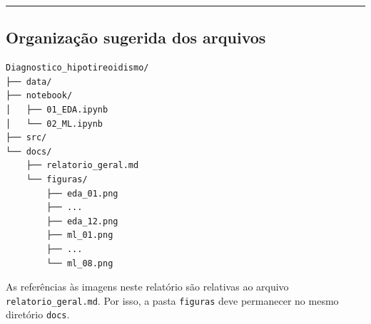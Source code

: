 \documentclass[
]{article}
\begin{document}
\begin{center}\rule{0.5\linewidth}{0.5pt}\end{center}

\hypertarget{organizauxe7uxe3o-sugerida-dos-arquivos}{%
\subsection{Organização sugerida dos
arquivos}\label{organizauxe7uxe3o-sugerida-dos-arquivos}}

\begin{verbatim}
Diagnostico_hipotireoidismo/
├── data/
├── notebook/
│   ├── 01_EDA.ipynb
│   └── 02_ML.ipynb
├── src/
└── docs/
    ├── relatorio_geral.md
    └── figuras/
        ├── eda_01.png
        ├── ...
        ├── eda_12.png
        ├── ml_01.png
        ├── ...
        └── ml_08.png
\end{verbatim}

As referências às imagens neste relatório são relativas ao arquivo
\texttt{relatorio\_geral.md}. Por isso, a pasta \texttt{figuras} deve
permanecer no mesmo diretório \texttt{docs}.
\end{document}

